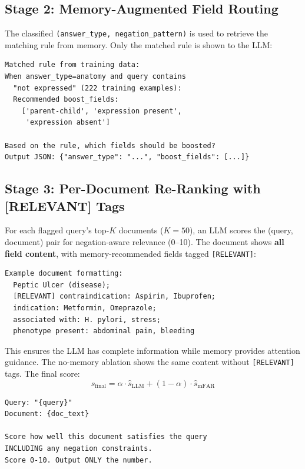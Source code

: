 \documentclass[11pt]{article}
\begin{document}
\subsection{Stage 2: Memory-Augmented Field Routing}

The classified \texttt{(answer\_type, negation\_pattern)} is used to retrieve the matching rule from memory. Only the matched rule is shown to the LLM:

\begin{lstlisting}
Matched rule from training data:
When answer_type=anatomy and query contains
  "not expressed" (222 training examples):
  Recommended boost_fields:
    ['parent-child', 'expression present',
     'expression absent']

Based on the rule, which fields should be boosted?
Output JSON: {"answer_type": "...", "boost_fields": [...]}
\end{lstlisting}

\subsection{Stage 3: Per-Document Re-Ranking with [RELEVANT] Tags}

For each flagged query's top-$K$ documents ($K=50$), an LLM scores the (query, document) pair for negation-aware relevance (0--10). The document shows \textbf{all field content}, with memory-recommended fields tagged \texttt{[RELEVANT]}:

\begin{lstlisting}
Example document formatting:
  Peptic Ulcer (disease);
  [RELEVANT] contraindication: Aspirin, Ibuprofen;
  indication: Metformin, Omeprazole;
  associated with: H. pylori, stress;
  phenotype present: abdominal pain, bleeding
\end{lstlisting}

This ensures the LLM has complete information while memory provides attention guidance. The no-memory ablation shows the same content without \texttt{[RELEVANT]} tags. The final score:
\begin{equation}
    s_{\text{final}} = \alpha \cdot \hat{s}_{\text{LLM}} + (1 - \alpha) \cdot \hat{s}_{\text{mFAR}}
\end{equation}

\begin{lstlisting}
Query: "{query}"
Document: {doc_text}

Score how well this document satisfies the query
INCLUDING any negation constraints.
Score 0-10. Output ONLY the number.
\end{lstlisting}
\end{document}
